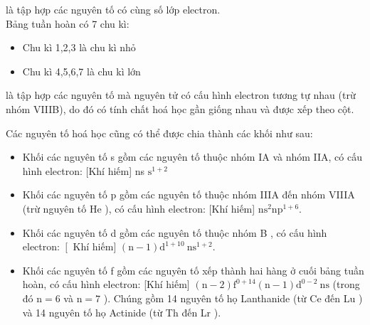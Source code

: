 \begin{ghinho}
	 là tập hợp các nguyên tố có cùng số lớp electron.\\
	Bảng tuần hoàn có 7 chu kì:
	\begin{itemize}
		\item Chu kì 1,2,3 là chu kì nhỏ
		\item Chu kì 4,5,6,7 là chu kì lớn
	\end{itemize}
	\begin{center}
	\end{center}
\end{ghinho}
\begin{ghinho}
	 là tập hợp các nguyên tố mà nguyên tử có cấu hình electron tương tự nhau (trừ nhóm VIIIB), do đó có tính chất hoá học gần giống nhau và được xếp theo cột.
	\begin{center}
	\end{center}
\end{ghinho}
\begin{tomtat}
	Các nguyên tố hoá học cũng có thể được chia thành các khối như sau:
	\begin{itemize}
		\item  Khối các nguyên tố s gồm các nguyên tố thuộc nhóm IA và nhóm IIA, có cấu hình electron: [Khí hiếm] ns $\mathrm{s}^{1+2}$
		\item  Khối các nguyên tố p gồm các nguyên tố thuộc nhóm IIIA đến nhóm VIIIA (trừ nguyên tố He ), có cấu hình electron: [Khí hiếm] $\mathrm{ns}^2 \mathrm{np}^{1+6}$.
		\item  Khối các nguyên tố d gồm các nguyên tố thuộc nhóm B , có cấu hình electron: $\left[\right.$ Khí hiếm] $(\mathrm{n}-1) \mathrm{d}^{1+10} \mathrm{~ns}^{1+2}$.
		\item  Khối các nguyên tố f gồm các nguyên tố xếp thành hai hàng ở cuối bảng tuần hoàn, có cấu hình electron: [Khí hiếm] $(\mathrm{n}-2) \mathrm{f}^{0+14}(\mathrm{n}-1) \mathrm{d}^{0-2} \mathrm{~ns}$ (trong đó $\mathrm{n}=6$ và $\mathrm{n}=7$ ). Chúng gồm 14 nguyên tố họ Lanthanide (từ Ce đến Lu ) và 14 nguyên tố họ Actinide (từ Th đến Lr ).
	\end{itemize}
\end{tomtat}